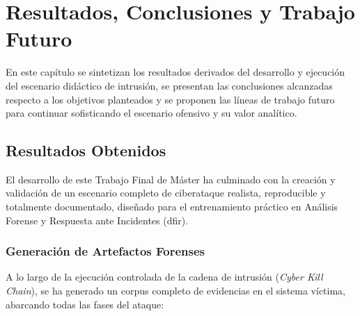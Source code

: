 \chapter{Resultados, Conclusiones y Trabajo Futuro}
\label{chap:resultados-conclusiones}

En este capítulo se sintetizan los resultados derivados del desarrollo y ejecución del escenario didáctico de intrusión, se presentan las conclusiones alcanzadas respecto a los objetivos planteados y se proponen las líneas de trabajo futuro para continuar sofisticando el escenario ofensivo y su valor analítico.

\section{Resultados Obtenidos}

El desarrollo de este Trabajo Final de Máster ha culminado con la creación y validación de un escenario completo de ciberataque realista, reproducible y totalmente documentado, diseñado para el entrenamiento práctico en Análisis Forense y Respuesta ante Incidentes (\acrshort{dfir}).

\subsection{Generación de Artefactos Forenses}

A lo largo de la ejecución controlada de la cadena de intrusión (\textit{Cyber Kill Chain}), se ha generado un corpus completo de evidencias en el sistema víctima, abarcando todas las fases del ataque:

